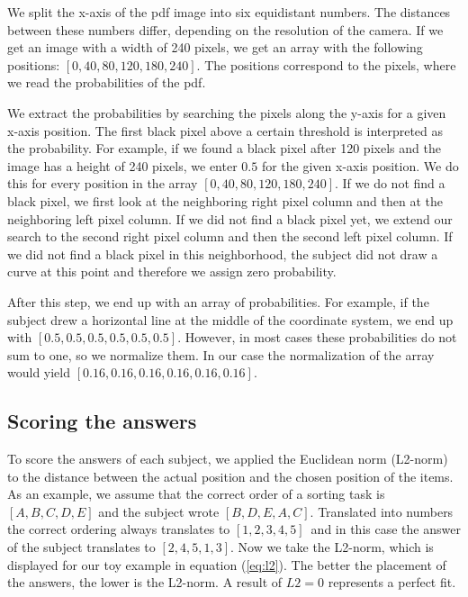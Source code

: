 \documentclass[../main/main.tex]{subfiles}
\begin{document}
	We split the x-axis of the pdf image into six equidistant numbers. The distances between these numbers differ, depending on the resolution of the camera. If we get an image with a width of 240 pixels, we get an array with the following positions: $[0, 40, 80, 120, 180, 240]$. The positions correspond to the pixels, where we read the probabilities of the pdf. 
	
	We extract the probabilities by searching the pixels along the y-axis for a given x-axis position. The first black pixel above a certain threshold is interpreted as the probability. For example, if we found a black pixel after 120 pixels and the image has a height of 240 pixels, we enter $0.5$ for the given x-axis position. We do this for every position in the array $[0, 40, 80, 120, 180, 240]$. If we do not find a black pixel, we first look at the neighboring right pixel column and then at the neighboring left pixel column. If we did not find a black pixel yet, we extend our search to the second right pixel column and then the second left pixel column. If we did not find a black pixel in this neighborhood, the subject did not draw a curve at this point and therefore we assign zero probability.
	
	After this step, we end up with an array of probabilities. For example, if the subject drew a horizontal line at the middle of the coordinate system, we end up with $[0.5, 0.5, 0.5, 0.5, 0.5, 0.5]$. However, in most cases these probabilities do not sum to one, so we normalize them. In our case the normalization of the array would yield $[0.16, 0.16, 0.16, 0.16, 0.16, 0.16]$.
	
	\subsection{Scoring the answers}
	
	To score the answers of each subject, we applied the Euclidean norm (L2-norm) to the distance between the actual position and the chosen position of the items. As an example, we assume that  the correct order of a sorting task is $[A, B, C, D, E]$ and the subject wrote $[B, D, E, A, C]$. Translated into numbers the correct ordering always translates to $[1, 2, 3, 4, 5]$ and in this case the answer of the subject translates to $[2, 4, 5, 1, 3]$. Now we take the L2-norm, which is displayed for our toy example in equation (\ref{eq:l2}). The better the placement of the answers, the lower is the L2-norm. A result of $L2 = 0$ represents a perfect fit.
	
\end{document}

